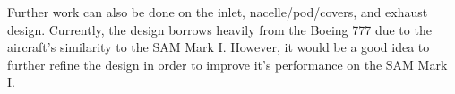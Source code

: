 Further work can also be done on the inlet, nacelle/pod/covers, and exhaust design. Currently, the design borrows heavily from the Boeing 777 due to the aircraft's similarity to the SAM Mark I. However, it would be a good idea to further refine the design in order to improve it's performance on the SAM Mark I.




